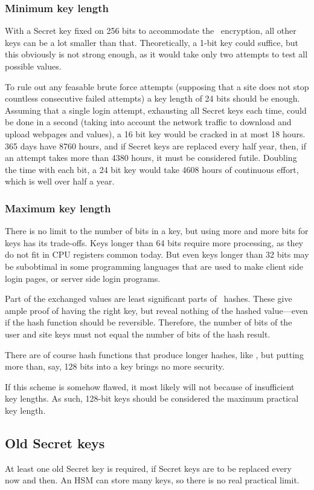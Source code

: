 \subsubsection{Minimum key length}
With a Secret key fixed on 256 bits to accommodate the \AES\ encryption,
all other keys can be a lot smaller than that.
Theoretically,
a 1-bit key could suffice,
but this obviously is not strong enough,
as it would take only two attempts to test all possible values.
\par
To rule out any feasable brute force attempts
(supposing that a site does not stop countless consecutive failed attempts)
a key length of 24 bits should be enough.
Assuming that a single login attempt,
exhausting all Secret keys each time,
could be done in a second
(taking into account the network traffic to download and upload webpages and values),
a 16 bit key would be cracked in at most 18 hours.
365 days have 8760 hours,
and if Secret keys are replaced every half year,
then,
if an attempt takes more than 4380 hours,
it must be considered futile.
Doubling the time with each bit,
a 24 bit key would take 4608 hours of continuous effort,
which is well over half a year.
\subsubsection{Maximum key length}
There is no limit to the number of bits in a key,
but using more and more bits for keys has its trade-offs.
Keys longer than 64 bits require more processing,
as they do not fit in CPU registers common today.
But even keys longer than 32 bits may be subobtimal in some programming languages that are used to make client side login pages,
or server side login programs.
\par
Part of the exchanged values are least significant parts of \SHA\ hashes.
These give ample proof of having the right key,
but reveal nothing of the hashed value---even if the hash function should be reversible.
Therefore,
the number of bits of the user and site keys must not equal the number of bits of the hash result.
\par
There are of course hash functions that produce longer hashes,
like ,
but putting more than,
say,
128 bits into a key brings no more security.
\par
If this scheme is somehow flawed,
it most likely will not because of insufficient key lengths.
As such,
128-bit keys should be considered the maximum practical key length.
\subsection{Old Secret keys}
At least one old Secret key is required,
if Secret keys are to be replaced every now and then.
An HSM can store many keys,
so there is no real practical limit.
